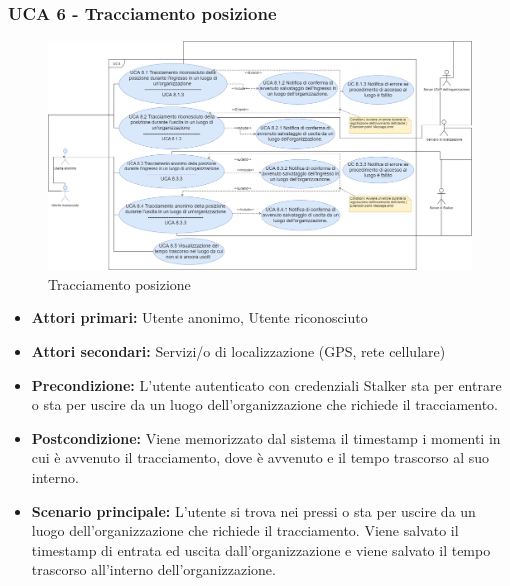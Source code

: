 \newpage

\subsubsection{UCA 6 - Tracciamento posizione}%

\begin{figure}[h]
	\centering
	\includegraphics[scale=0.3]{sezioni/UseCase/Immagini/UCA6.png}
	\caption{Tracciamento posizione}
\end{figure}

\begin{itemize}
	\item \textbf{Attori primari:} Utente anonimo, Utente riconosciuto
	\item \textbf{Attori secondari:} Servizi/o di localizzazione (GPS, rete cellulare)
	\item \textbf{Precondizione:} L'utente autenticato con credenziali Stalker sta per entrare o sta per uscire da un luogo dell'organizzazione che richiede il tracciamento.
	\item \textbf{Postcondizione:} Viene memorizzato dal sistema il timestamp i momenti in cui è avvenuto il tracciamento, dove è avvenuto e il tempo trascorso al suo interno.
	\item \textbf{Scenario principale:} L'utente si trova nei pressi o sta per uscire da un luogo dell'organizzazione che richiede il tracciamento. Viene salvato il timestamp di entrata ed uscita dall'organizzazione e viene salvato il tempo trascorso all'interno dell'organizzazione.
\end{itemize}

